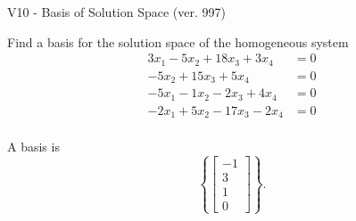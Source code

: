 \begin{exercise}
  \begin{exerciseTitle}V10 - Basis of Solution Space (ver. 997)\end{exerciseTitle}
  \begin{exerciseStatement}
    Find a basis for the solution space of the homogeneous system 
\begin{align*}
 3 x_ 1 -5 x_ 2 + 18 x_ 3 + 3 x_ 4 &= 0  \\ 
  -5 x_ 2 + 15 x_ 3 + 5 x_ 4 &= 0  \\ 
  -5 x_ 1 -1 x_ 2 -2 x_ 3 + 4 x_ 4 &= 0  \\ 
  -2 x_ 1 + 5 x_ 2 -17 x_ 3 -2 x_ 4 &= 0  \\ 
 \end{align*}


 
  \end{exerciseStatement}

  \begin{exerciseAnswer}
   A basis is   
\[\left\{\left[\begin{array}{c}
-1 \\
3 \\
1 \\
0
\end{array}\right]\right\}.\]

  


  \end{exerciseAnswer}
\end{exercise}